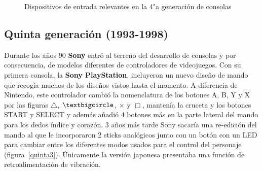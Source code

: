 \begin{figure}[t]
     \hfill
{}
     \caption{Dispositivos de entrada relevantes en la 4"a  generaci\'on de consolas}
     \label{fig:cuarta}
   \end{figure}

\subsection{Quinta generaci\'on (1993-1998)}



Durante los a\~nos 90 \textbf{Sony} entr\'o al terreno del desarrollo de consolas y por consecuencia, de modelos diferentes de controladores de videojuegos. Con su primera consola, la \textbf{Sony PlayStation}, incluyeron un nuevo dise\~no de mando que recog\'ia muchos de los dise\~nos vistos hasta el momento. A diferencia de Nintendo, este controlador cambi\'o la nomenclatura de los botones A, B, Y y X por las figuras $\triangle$, $\textbigcircle$, $\times$ y $\Box$, manten\'ia la cruceta y los botones START y SELECT y adem\'as a\~nadi\'o 4 botones m\'as en la parte lateral del mando para los dedos \'indice y coraz\'on. 3 a\~nos m\'as tarde Sony sacar\'ia una re-edici\'on del mando al que le incorporaron 2 sticks anal\'ogicos junto con un bot\'on con un LED para cambiar entre los diferentes modos usados para el control del personaje (figura~\ref{quinta3}). \'Unicamente la versi\'on japonesa presentaba una funci\'on de retroalimentaci\'on de vibraci\'on. \\

